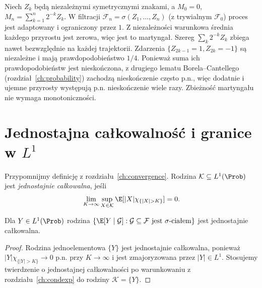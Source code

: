 \begin{przyklad}
Niech $Z_k$ będą niezależnymi symetrycznymi znakami,
a $M_0=0$, $M_n=\sum_{k=1}^n2^{-k}Z_k$.
W filtracji $\mathcal F_n=\sigma(Z_1,\ldots,Z_n)$
(z trywialnym $\mathcal F_0$) proces jest
adaptowany i ograniczony przez $1$.
Z niezależności warunkowa średnia każdego
przyrostu jest zerowa, więc jest to martyngał.
Szereg
$\sum_k2^{-k}Z_k$ zbiega nawet bezwzględnie
na każdej trajektorii. Zdarzenia $\{Z_{2k-1}=1,Z_{2k}=-1\}$ są niezależne
i mają prawdopodobieństwo $1/4$. Ponieważ suma ich prawdopodobieństw jest nieskończona,
z drugiego lematu Borela--Cantellego
(rozdział~\ref{ch:probability}) zachodzą
nieskończenie często p.n.,
więc dodatnie i ujemne przyrosty występują p.n.
nieskończenie wiele razy.
Zbieżność martyngału nie wymaga monotoniczności.
\end{przyklad}

\section{Jednostajna całkowalność i granice w \texorpdfstring{$L^1$}{L1}}

Przypomnijmy definicję z rozdziału~\ref{ch:convergence}.
Rodzina $\mathcal K\subseteq L^1(\Prob)$ jest
\emph{jednostajnie całkowalna}, jeśli
\[
\lim_{K\to\infty}\sup_{X\in\mathcal K}
\E[|X|\chi_{\{|X|>K\}}]=0.
\]

\begin{lemat}
\label{lem:rp1-15-ui-condexp}
Dla $Y\in L^1(\Prob)$ rodzina
$\{\E[Y\mid\mathcal G]:\mathcal G\subseteq\mathcal F
\text{ jest }\sigma\text{-ciałem}\}$
jest jednostajnie całkowalna.
\end{lemat}
\begin{proof}
Rodzina jednoelementowa $\{Y\}$ jest jednostajnie
całkowalna, ponieważ $|Y|\chi_{\{|Y|>K\}}\to0$
p.n. przy $K\to\infty$ i jest zmajoryzowana przez
$|Y|\in L^1$. Stosujemy twierdzenie o jednostajnej
całkowalności po warunkowaniu z rozdziału~\ref{ch:condexp}
do rodziny $\mathcal K=\{Y\}$.
\end{proof}


